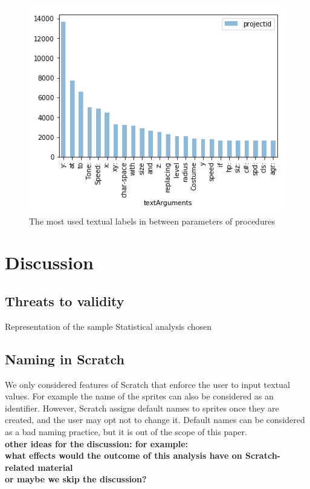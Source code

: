 \documentclass[conference]{IEEEtran}
\newcommand{\todo}[1]{ \textbf{#1} }
\begin{document}
\begin{figure}
	\begin{center}
		\includegraphics[width=\columnwidth]{fig/text_in_the_middle_func_occurrences}
		\caption{The most used textual labels in between parameters of procedures}
		\label{fig:labels}
	\end{center}
\end{figure} 



 \section{Discussion}
\subsection{Threats to validity}
Representation of the sample
Statistical analysis chosen
\subsection{Naming in Scratch}
We only considered features of Scratch that enforce the user to input textual values. For example the name of the sprites can also be considered as an identifier. However, Scratch assigns default names to sprites once they are created, and the user may opt not to change it. Default names can be considered as a bad naming practice, but it is out of the scope of this paper.\\
\todo{other ideas for the discussion: for example: \\
what effects would the outcome of this analysis have on Scratch-related material\\
or maybe we skip the discussion?
}
\end{document}
